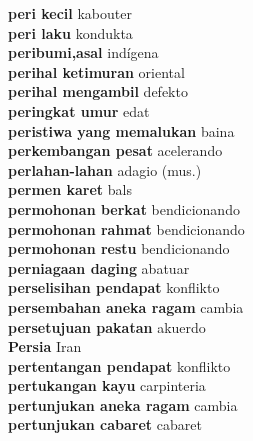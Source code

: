 \textbf{ peri kecil  } kabouter \\
\textbf{ peri laku  } kondukta \\
\textbf{ peribumi,asal  } indígena \\
\textbf{ perihal ketimuran  } oriental \\
\textbf{ perihal mengambil  } defekto \\
\textbf{ peringkat umur  } edat \\
\textbf{ peristiwa yang memalukan  } baina \\
\textbf{ perkembangan pesat  } acelerando \\
\textbf{ perlahan-lahan  } adagio (mus.) \\
\textbf{ permen karet  } bals \\
\textbf{ permohonan berkat  } bendicionando \\
\textbf{ permohonan rahmat  } bendicionando \\
\textbf{ permohonan restu  } bendicionando \\
\textbf{ perniagaan daging  } abatuar \\
\textbf{ perselisihan pendapat  } konflikto \\
\textbf{ persembahan aneka ragam  } cambia \\
\textbf{ persetujuan pakatan  } akuerdo \\
\textbf{ Persia  } Iran \\
\textbf{ pertentangan pendapat  } konflikto \\
\textbf{ pertukangan kayu  } carpinteria \\
\textbf{ pertunjukan aneka ragam  } cambia \\
\textbf{ pertunjukan cabaret  } cabaret \\

